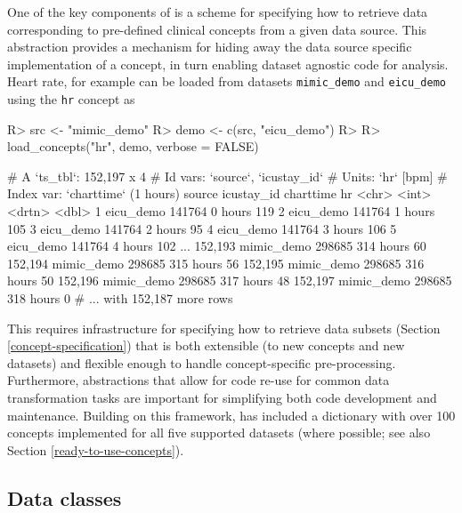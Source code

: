 \documentclass[
  notitle]{jss}
\begin{document}
One of the key components of  is a scheme for specifying how
to retrieve data corresponding to pre-defined clinical concepts from a
given data source. This abstraction provides a mechanism for hiding away
the data source specific implementation of a concept, in turn enabling
dataset agnostic code for analysis. Heart rate, for example can be
loaded from datasets \texttt{mimic\_demo} and \texttt{eicu\_demo} using
the \texttt{hr} concept as

\begin{CodeChunk}
\begin{CodeInput}
R> src  <- "mimic_demo"
R> demo <- c(src, "eicu_demo")
R> 
R> load_concepts("hr", demo, verbose = FALSE)
\end{CodeInput}
\begin{CodeOutput}
# A `ts_tbl`: 152,197 x 4
# Id vars:    `source`, `icustay_id`
# Units:      `hr` [bpm]
# Index var:  `charttime` (1 hours)
        source     icustay_id charttime    hr
        <chr>           <int> <drtn>    <dbl>
      1 eicu_demo      141764   0 hours   119
      2 eicu_demo      141764   1 hours   105
      3 eicu_demo      141764   2 hours    95
      4 eicu_demo      141764   3 hours   106
      5 eicu_demo      141764   4 hours   102
    ...
152,193 mimic_demo     298685 314 hours    60
152,194 mimic_demo     298685 315 hours    56
152,195 mimic_demo     298685 316 hours    50
152,196 mimic_demo     298685 317 hours    48
152,197 mimic_demo     298685 318 hours     0
# ... with 152,187 more rows
\end{CodeOutput}
\end{CodeChunk}

This requires infrastructure for specifying how to retrieve data subsets
(Section \ref{concept-specification}) that is both extensible (to new
concepts and new datasets) and flexible enough to handle
concept-specific pre-processing. Furthermore, abstractions that allow
for code re-use for common data transformation tasks are important for
simplifying both code development and maintenance. Building on this
framework,  has included a dictionary with over 100 concepts
implemented for all five supported datasets (where possible; see also
Section \ref{ready-to-use-concepts}).

\hypertarget{data-classes}{%
\subsection{Data classes}\label{data-classes}}
\end{document}
